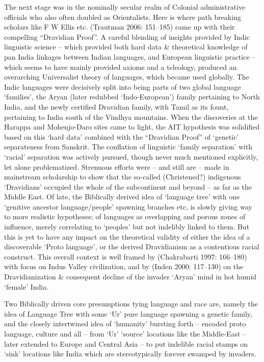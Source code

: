 The next stage was in the nominally secular realm of Colonial administrative officials who also often doubled as Orientalists. Here is where path breaking scholars like F W Ellis etc. (Trautman 2006: 151–185) came up with their compelling “Dravidian Proof”. A careful blending of insights provided by Indic linguistic science – which provided both hard data \& theoretical knowledge of pan India linkages between Indian languages, and European linguistic practice – which seems to have mainly provided axioms and a teleology, produced an overarching Universalist theory of languages, which became used globally. The Indic languages were decisively split into being parts of two global language ‘families’, the Aryan (later redubbed ‘Indo-European’) family pertaining to North India, and the newly certified Dravidian family, with Tamil as its fount, pertaining to India south of the Vindhya mountains. When the discoveries at the Harappa and Mohenjo-Daro sites came to light, the AIT hypothesis was solidified based on this ‘hard data’ combined with the “Dravidian Proof” of ‘genetic’ separateness from Sanskrit. The conflation of linguistic ‘family separation’ with ‘racial’ separation was actively pursued, though never much mentioned explicitly, let alone problematized. Strenuous efforts were – and still are – made in mainstream scholarship to show that the so-called (Christened?) indigenous ‘Dravidians’ occupied the whole of the subcontinent and beyond – as far as the Middle East. Of late, the Biblically derived idea of ‘language tree’ with one ‘genitive ancestor language/people’ spawning branches etc, is slowly giving way to more realistic hypotheses; of languages as overlapping and porous zones of influence, merely correlating to ‘peoples’ but not indelibly linked to them. But this is yet to have any impact on the theoretical validity of either the idea of a discoverable ‘Proto language’, or the derived Dravidianism as a contentious racial construct. This overall context is well framed by (Chakrabarti 1997: 166–180) with focus on Indus Valley civilization, and by (Inden 2000: 117–130) on the Dravidianization \& consequent decline of the invader ‘Aryan’ mind in hot humid ‘female’ India.

Two Biblically driven core presumptions tying language and race are, namely the idea of Language Tree with some ‘Ur’ pure language spawning a genetic family, and the closely intertwined idea of ‘humanity’ bursting forth – encoded proto language, culture and all – from ‘Ur’ ‘source’ locations like the Middle-East – later extended to Europe and Central Asia – to put indelible racial stamps on ‘sink’ locations like India which are stereotypically forever swamped by invaders.

